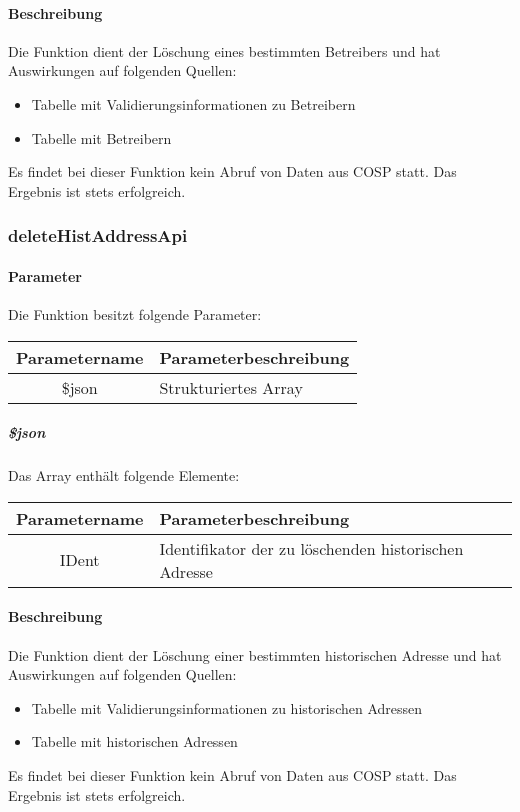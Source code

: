 \paragraph{Beschreibung} Die Funktion dient der Löschung eines bestimmten Betreibers und hat Auswirkungen auf folgenden Quellen:
\begin{itemize}
	\item Tabelle mit Validierungsinformationen zu Betreibern
	\item Tabelle mit Betreibern
\end{itemize}
Es findet bei dieser Funktion kein Abruf von Daten aus {\glqq COSP\grqq} statt. Das Ergebnis ist stets erfolgreich.
\subsubsection{deleteHistAddressApi}
\paragraph{Parameter} Die Funktion besitzt folgende Parameter:
\begin{table}[H]
	\begin{tabular}{|c|p{11cm}|}
		\hline
		\textbf{Parametername} & \textbf{Parameterbeschreibung} \\ \hline
		\$json & Strukturiertes Array \\ \hline
	\end{tabular}
\end{table}
\subparagraph{\$json}Das Array enthält folgende Elemente:
\begin{table}[H]
	\begin{tabular}{|c|p{11cm}|}
		\hline
		\textbf{Parametername} & \textbf{Parameterbeschreibung} \\ \hline
		IDent & Identifikator der zu löschenden historischen Adresse \\ \hline
	\end{tabular}
\end{table}
\paragraph{Beschreibung} Die Funktion dient der Löschung einer bestimmten historischen Adresse und hat Auswirkungen auf folgenden Quellen:
\begin{itemize}
	\item Tabelle mit Validierungsinformationen zu historischen Adressen
	\item Tabelle mit historischen Adressen
\end{itemize}
Es findet bei dieser Funktion kein Abruf von Daten aus {\glqq COSP\grqq} statt. Das Ergebnis ist stets erfolgreich.
